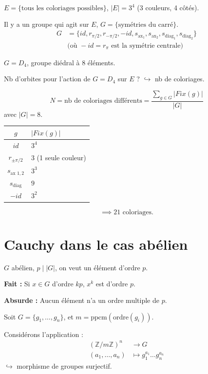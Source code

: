 $E = \{ \text{tous les coloriages possibles} \}$, $|E| = 3^4$ (3 couleurs, 4 côtés).

Il y a un groupe qui agit sur $E$, $G = \{ \text{symétries du carré} \}$.
\begin{align*}
    G &= \{ id, r_{\pi/2}, r_{-\pi/2}, -id, s_{\text{ax}_1}, s_{\text{ax}_2}, s_{\text{diag}_1}, s_{\text{diag}_2} \} \\
    &\text{(où } -id = r_\pi \text{ est la symétrie centrale)}
\end{align*}

$G = D_4$, groupe diédral à 8 éléments.

Nb d'orbites pour l'action de $G=D_4$ sur $E$ ? $\hookrightarrow$ nb de coloriages.

\[ N = \text{nb de coloriages différents} = \frac{\sum_{g \in G} |Fix(g)|}{|G|} \]
avec $|G|=8$.

\begin{center}
\renewcommand{\arraystretch}{1.5}
\begin{tabular}{c|l}
    $g$ & $|Fix(g)|$ \\
    \hline
    $id$ & $3^4$ \\
    \hline
    $r_{\pm \pi/2}$ & $3$ (1 seule couleur) \\
    \hline
    $s_{\text{ax } 1,2}$ & $3^3$ \\
    \hline
    $s_{\text{diag}}$ & $9$ \\
    \hline
    $-id$ & $3^2$
\end{tabular}
\end{center}

\[ \implies 21 \text{ coloriages}. \]

\section*{Cauchy dans le cas abélien}

$G$ abélien, $p \mid |G|$, on veut un élément d'ordre $p$.

\textbf{Fait :} Si $x \in G$ d'ordre $kp$, $x^k$ est d'ordre $p$.

\textbf{Absurde :} Aucun élément n'a un ordre multiple de $p$.

Soit $G = \{g_1, \dots, g_n\}$, et $m = \text{ppcm}(\text{ordre}(g_i))$.

Considérons l'application :
\begin{align*}
    (\mathbb{Z}/m\mathbb{Z})^n &\longrightarrow G \\
    (a_1, \dots, a_n) &\longmapsto g_1^{a_1} \dots g_n^{a_n}
\end{align*}
$\hookrightarrow$ morphisme de groupes surjectif.

